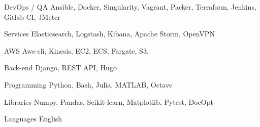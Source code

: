 

\begin{cvskills}

  \cvskill
    {DevOps / QA} %
    {Ansible, Docker, Singularity, Vagrant, Packer, Terraform, Jenkins, Gitlab CI, JMeter} %

  \cvskill
    {Services} %
    {Elasticsearch, Logstash, Kibana, Apache Storm, OpenVPN} %

  \cvskill
    {AWS} %
    {Aws-cli, Kinesis, EC2, ECS, Fargate, S3, } %

  \cvskill
    {Back-end} %
    {Django, REST API, Hugo} %

  \cvskill
    {Programming} %
    {Python, Bash, Julia, MATLAB, Octave} %

  \cvskill
    {Libraries} %
    {Numpy, Pandas, Scikit-learn, Matplotlib, Pytest, DocOpt} %

  \cvskill
    {Languages} %
    {English} %

\end{cvskills}
